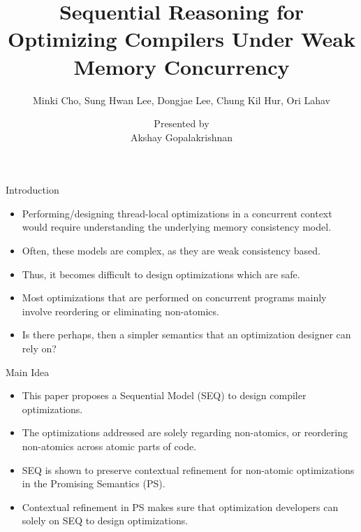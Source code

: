 \documentclass[xcolor=dvipsnames, notes]{beamer}
\title{Sequential Reasoning for Optimizing Compilers Under Weak Memory Concurrency}
\subtitle{Minki Cho, Sung Hwan Lee, Dongjae Lee, Chung Kil Hur, Ori Lahav}
\author{Presented by \\ Akshay Gopalakrishnan}
\begin{document}
    \begin{frame}
        
        \maketitle

    \end{frame}


    \begin{frame}{Introduction}
        
        \begin{itemize}
            \item Performing/designing thread-local optimizations in a concurrent context would require understanding the underlying memory consistency model.
            \item Often, these models are complex, as they are weak consistency based.
            \item Thus, it becomes difficult to design optimizations which are safe.
            \item Most optimizations that are performed on concurrent programs mainly involve reordering or eliminating non-atomics.
            \item Is there perhaps, then a simpler semantics that an optimization designer can rely on?
        \end{itemize}

    \end{frame}

    \begin{frame}{Main Idea}
        
        \begin{itemize}
            \item This paper proposes a Sequential Model (SEQ) to design compiler optimizations.
            \item The optimizations addressed are solely regarding non-atomics, or reordering non-atomics across atomic parts of code. 
            \item SEQ is shown to preserve contextual refinement for non-atomic optimizations in the Promising Semantics (PS).
            \item Contextual refinement in PS makes sure that optimization developers can solely on SEQ to design optimizations.  
        \end{itemize}

    \end{frame}
\end{document}
